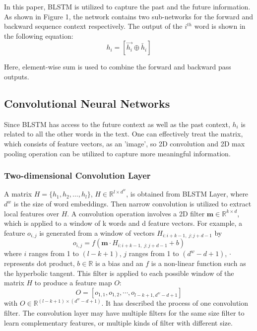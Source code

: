 \documentclass[11pt]{article}
\begin{document}
In this paper, BLSTM is utilized to capture the past and the future information. As shown in Figure 1, the network contains two sub-networks for the forward and backward sequence context respectively. 
The output of the $i^{th}$ word is shown in the following equation:
\begin{equation}
h_i=[\overrightarrow{h_i} \oplus \overleftarrow{h_i}]
\end{equation}

Here, element-wise sum is used to combine the forward and backward pass outputs.


\subsection{Convolutional Neural Networks}
\label{cnn_detail}
Since BLSTM has access to the future context as well as the past context, $h_i$ is related to all the other words in the text. One can effectively treat the matrix, which consists of feature vectors, as an 'image', so 2D convolution and 2D max pooling operation can be utilized to capture more meaningful information. 
\subsubsection{Two-dimensional Convolution Layer}
A matrix $H = \{h_1, h_2, \dots, h_l\}$, $H \in \mathbb{R}^{l \times d^w}$, is obtained from BLSTM Layer, where $d^w$ is the size of word embeddings. 
Then narrow convolution is utilized \cite{kalchbrenner2014convolutional} to extract local features over $H$. A convolution operation involves a 2D filter $\mathbf{m} \in \mathbb{R}^{k \times d}$, which is applied to a window of k words and d feature vectors. For example, a feature $o_{i, j}$ is generated from a window of vectors $H_{i:i+k-1, \; j:j+d-1}$ by
\begin{equation}
o_{i, j} = f(\mathbf{m}  \cdot H_{i:i+k-1, \; j:j+d-1} + b)
\end{equation}
where $i$ ranges from 1 to $(l-k+1)$, $j$ ranges from 1 to $(d^w-d+1)$, $\cdot$ represents dot product, $b \in \mathbb{R}$ is a bias and an $f$ is a non-linear function such as the hyperbolic tangent. This filter is applied to each possible window of the matrix $H$ to produce a feature map $O$:
\begin{equation}
O = [o_{1,1}, o_{1,2}, \cdots, o_{l-k+1, d^w-d+1}] 
\end{equation}
with $O \in \mathbb{R}^{(l-k+1) \times (d^w-d+1)}$. It has described the process of one convolution filter. The convolution layer may have multiple filters for the same size filter to learn complementary features, or multiple kinds of filter with different size.
\end{document}
